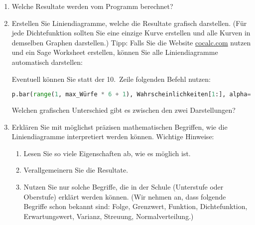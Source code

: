 \documentclass{article}
\begin{document}
\begin{enumerate}
\item Welche Resultate werden vom Programm berechnet?
\item Erstellen Sie Liniendiagramme, welche die Resultate grafisch darstellen. (Für jede
Dichtefunktion sollten Sie eine einzige Kurve erstellen und alle Kurven in demselben Graphen
dar\-stellen.) Tipp: Falls Sie die Website \url{cocalc.com} nutzen und ein Sage Worksheet
erstellen, können Sie alle Liniendiagramme automatisch darstellen:

Eventuell können Sie statt der 10.~Zeile folgenden Befehl nutzen:
\begin{lstlisting}[language=Python,firstnumber=10]
    p.bar(range(1, max_Würfe * 6 + 1), Wahrscheinlichkeiten[1:], alpha=0.5)
\end{lstlisting}
Welchen grafischen Unterschied gibt es zwischen den zwei Darstellungen?
\item Erklären Sie mit möglichst präzisen mathematischen Begriffen, wie die Liniendiagramme interpretiert werden können.
Wichtige Hinweise:
\begin{enumerate}
\item Lesen Sie so viele Eigenschaften ab, wie es möglich ist.
\item Verallgemeinern Sie die Resultate.
\item Nutzen Sie nur solche Begriffe, die in der Schule (Unterstufe oder Oberstufe) erklärt werden können.
(Wir nehmen an, dass folgende Begriffe schon bekannt sind: Folge, Grenz\-wert, Funktion,
Dichtefunktion, Erwartungswert, Varianz, Streuung, Normalverteilung.)
\end{enumerate}

\end{enumerate}
\end{document}
